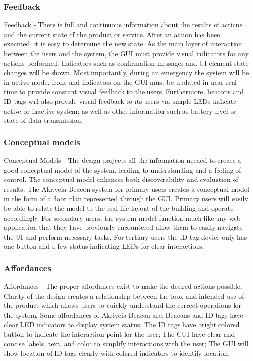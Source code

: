 \subsubsection{Feedback}
\medskip
Feedback - There is full and continuous information about the results of actions and the current state of the product or service. After an action has been executed, it is easy to determine the new state. As the main layer of interaction between the users and the system, the GUI must provide visual indicators for any actions performed. Indicators such as confirmation messages and UI element state changes will be shown. Most importantly, during an emergency the system will be in active mode, icons and indicators on the GUI must be updated in near real time to provide constant visual feedback to the users. Furthermore, beacons and ID tags will also provide visual feedback to its users via simple LEDs indicate active or inactive system; as well as other information such as battery level or state of data transmission. 
\pagebreak


\subsubsection{Conceptual models}
Conceptual Models - The design projects all the information needed to create a good conceptual model of the system, leading to understanding and a feeling of control. The conceptual model enhances both discoverability and evaluation of results. The Akriveia Beacon system for primary users creates a conceptual model in the form of a floor plan represented through the GUI. Primary users will easily be able to relate the model to the real life layout of the building and operate accordingly. For secondary users, the system model function much like any web application that they have previously encountered allow them to easily navigate the UI and perform necessary tasks. For tertiary users the ID tag device only has one button and a few status indicating LEDs for clear interactions.

\medskip
\subsubsection{Affordances}
Affordances - The proper affordances exist to make the desired actions possible. Clarity of the design creates a relationship between the look and intended use of the product which allows users to quickly understand the correct operations for the system. Some affordances of Akriveia Beacon are: Beacons and ID tags have clear LED indicators to display system status; The ID tags have bright colored button to indicate the interaction point for the user; The GUI have clear and concise labels, text, and color to simplify interactions with the user; The GUI will show location of ID tags clearly with colored indicators to identify location.

